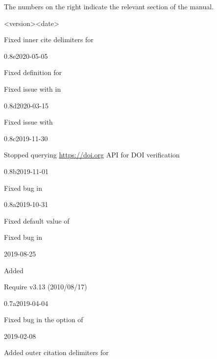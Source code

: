 \documentclass[DIV=9]{scrartcl}
\begin{document}
The numbers on the right indicate the relevant section of the manual.
\begin{changelog}
\begin{release}{<version>}{<date>}
  \item Fixed inner cite delimiters for %
\end{release}
\begin{release}{0.8e}{2020-05-05}
  \item Fixed  definition for
  \item Fixed issue with  in
\end{release}
\begin{release}{0.8d}{2020-03-15}
  \item Fixed issue with 
\end{release}
\begin{release}{0.8c}{2019-11-30}
  \item Stopped querying \url{https://doi.org} API for DOI
    verification
\end{release}
\begin{release}{0.8b}{2019-11-01}
  \item Fixed bug in %
\end{release}
\begin{release}{0.8a}{2019-10-31}
  \item Fixed default value of 
  \item Fixed bug in %
\end{release}
\begin{release}{0.8}{2019-08-25}
  \item Added  
  \item Require  v3.13 (2010/08/17)
\end{release}
\begin{release}{0.7a}{2019-04-04}
  \item Fixed bug in the  option of %
\end{release}
\begin{release}{0.7}{2019-02-08}
  \item Added outer citation delimiters for %

\end{release}
\end{changelog}
\end{document}
